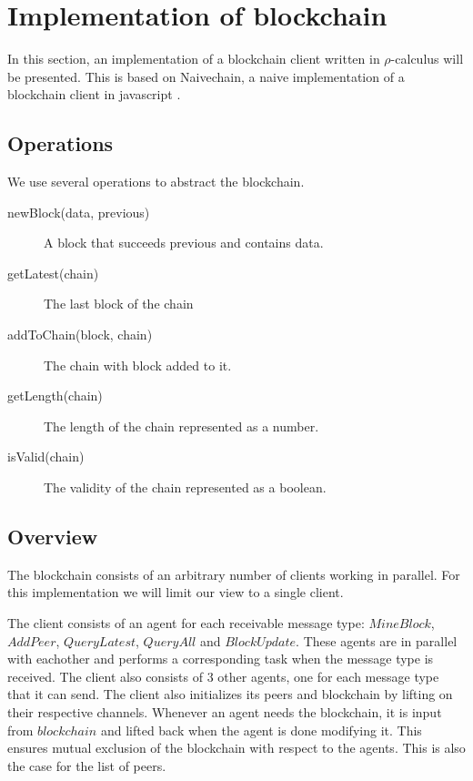 \section{Implementation of blockchain}
In this section, an implementation of a blockchain client written in $\rho$-calculus will be presented.
This is based on Naivechain, a naive implementation of a blockchain client in javascript \cite{naivechain}.

\subsection{Operations}

We use several operations to abstract the blockchain.

\begin{description}
	\item[newBlock(data, previous)]
	A block that succeeds previous and contains data.
	\item[getLatest(chain)]
	The last block of the chain
	\item[addToChain(block, chain)]
	The chain with block added to it.
	\item[getLength(chain)]
	The length of the chain represented as a number.
	\item[isValid(chain)]
	The validity of the chain represented as a boolean.
\end{description}

\subsection{Overview}

The blockchain consists of an arbitrary number of clients working in parallel. For this implementation we will limit our view to a single client.

The client consists of an agent for each receivable message type: $MineBlock$, $AddPeer$, $QueryLatest$, $QueryAll$ and $BlockUpdate$.
These agents are in parallel with eachother and performs a corresponding task when the message type is received.
The client also consists of 3 other agents, one for each message type that it can send.
The client also initializes its peers and blockchain by lifting on their respective channels.
Whenever an agent needs the blockchain, it is input from $blockchain$ and lifted back when the agent is done modifying it.
This ensures mutual exclusion of the blockchain with respect to the agents.
This is also the case for the list of peers.

